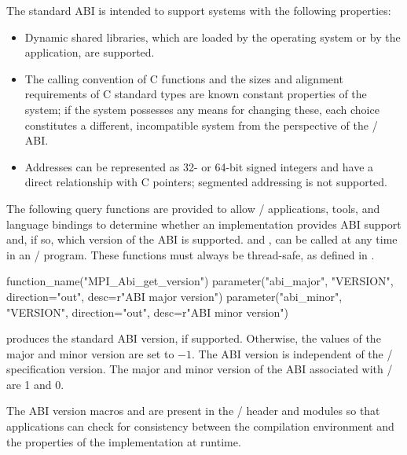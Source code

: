 The standard ABI is intended to support systems with the
following properties:
\begin{itemize}
    \item Dynamic shared libraries, which are loaded
          by the operating system or by the application,
          are supported.
    \item The calling convention of C functions and the
          sizes and alignment requirements of C standard
          types are known constant properties of the system;
          if the system possesses any means for changing
          these, each choice constitutes a different,
          incompatible system from the perspective of the \MPI/ ABI.
    \item Addresses can be represented as 32- or 64-bit signed
          integers and have a direct relationship with C pointers;
          segmented addressing is not supported.
\end{itemize}


The following query functions are provided to allow \MPI/ applications, tools, 
and language bindings to determine whether an implementation provides ABI support
and, if so, which version of the ABI is supported.
and ,
can be called at any time in an \MPI/ program.
These functions must always be thread-safe, as defined in
.

\begin{mpi-binding}
    function_name("MPI_Abi_get_version")
    parameter("abi_major", "VERSION", direction="out", desc=r"ABI major version")
    parameter("abi_minor", "VERSION", direction="out", desc=r"ABI minor version")
\end{mpi-binding}

 produces the standard ABI version, if supported.
Otherwise, the values of the major and minor version are set to $-1$.
The ABI version is independent of the \MPI/ specification version.
The major and minor version of the ABI associated with \MPIVDOTO/
are 1 and 0.

The ABI version macros  and
 are present in the \MPI/ header and modules
so that applications can check for consistency between the compilation
environment and the properties of the implementation at runtime.

